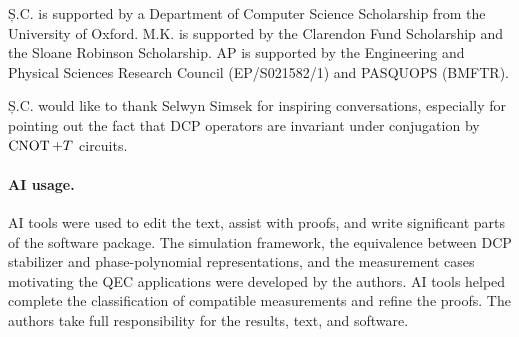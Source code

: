 \begin{acknowledgments}
    Ș.C. is supported by a Department of Computer Science Scholarship from the University of Oxford.
    M.K. is supported by the Clarendon Fund Scholarship and the Sloane Robinson Scholarship.
    AP is supported by the Engineering and Physical Sciences Research Council (EP/S021582/1) and PASQUOPS (BMFTR).

    Ș.C. would like to thank Selwyn Simsek for inspiring conversations, especially for pointing out the fact that DCP operators are invariant under conjugation by $\operatorname{CNOT}+T$ circuits.

    \vspace{\baselineskip}
    \paragraph*{AI usage.}
    AI tools were used to edit the text, assist with proofs, and write significant parts of the software package.
    The simulation framework, the equivalence between DCP stabilizer and phase-polynomial representations, and the measurement cases motivating the QEC applications were developed by the authors.
    AI tools helped complete the classification of compatible measurements and refine the proofs.
    The authors take full responsibility for the results, text, and software.
\end{acknowledgments}

